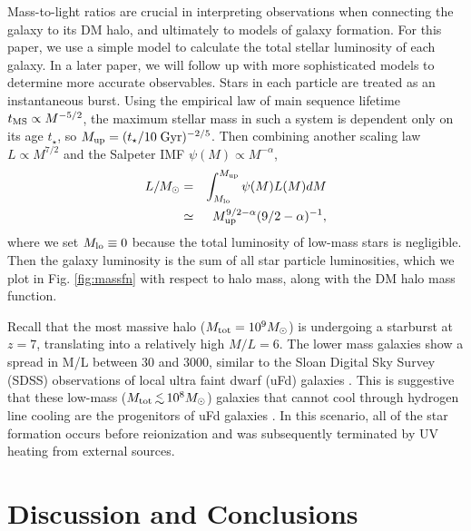 \documentclass[12pt,preprint]{aastex}
\begin{document}
Mass-to-light ratios are crucial in interpreting observations when
connecting the galaxy to its DM halo, and ultimately to models of
galaxy formation.  For this paper, we use a simple model to calculate
the total stellar luminosity of each galaxy.  In a later paper, we
will follow up with more sophisticated models to determine more
accurate observables.  Stars in each particle are treated as an
instantaneous burst.  Using the empirical law of main sequence
lifetime $t_{\rm MS} \propto M^{-5/2}$, the maximum stellar mass in
such a system is dependent only on its age $t_\star$, so $M_{\rm up} =
(t_\star / 10\;\mathrm{Gyr})^{-2/5}$.  Then combining another scaling
law $L \propto M^{7/2}$ and the Salpeter IMF $\psi(M) \propto
M^{-\alpha}$,
%
\begin{eqnarray}
  \label{eqn:lum}
  L/M_\odot &=& \int_{M_{\rm lo}}^{M_{\rm up}} \psi(M) L(M) dM
  \nonumber\\ &\simeq& M_{\rm up}^{9/2-\alpha} (9/2 - \alpha)^{-1},
\end{eqnarray}
where we set $M_{\rm lo} \equiv 0$ because the total luminosity of
low-mass stars is negligible.  Then the galaxy luminosity is the sum
of all star particle luminosities, which we plot in
Fig. \ref{fig:massfn} with respect to halo mass, along with the DM
halo mass function.

Recall that the most massive halo ($M_{\rm tot} = 10^9 \Ms$) is
undergoing a starburst at $z=7$, translating into a relatively high
$M/L = 6$.  The lower mass galaxies show a spread in M/L between 30
and 3000, similar to the Sloan Digital Sky Survey (SDSS) observations
of local ultra faint dwarf (uFd) galaxies \citep[e.g.][]{Strigari08}.
This is suggestive that these low-mass ($M_{\rm tot} \lsim 10^8 \Ms$)
galaxies that cannot cool through hydrogen line cooling are the
progenitors of uFd galaxies \citep{Bovill11a, Bovill11b}.  In this
scenario, all of the star formation occurs before reionization and
was subsequently terminated by UV heating from external sources.

\section{Discussion and Conclusions}
\label{sec:discuss}
\end{document}
